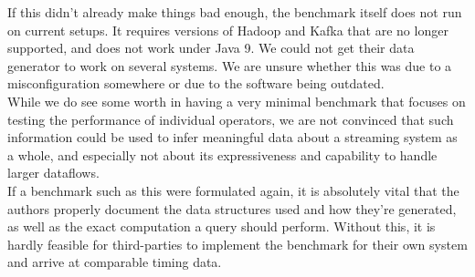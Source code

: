 If this didn't already make things bad enough, the benchmark itself does not run on current setups. It requires versions of Hadoop and Kafka that are no longer supported, and does not work under Java 9. We could not get their data generator to work on several systems. We are unsure whether this was due to a misconfiguration somewhere or due to the software being outdated. \\

While we do see some worth in having a very minimal benchmark that focuses on testing the performance of individual operators, we are not convinced that such information could be used to infer meaningful data about a streaming system as a whole, and especially not about its expressiveness and capability to handle larger dataflows. \\

If a benchmark such as this were formulated again, it is absolutely vital that the authors properly document the data structures used and how they're generated, as well as the exact computation a query should perform. Without this, it is hardly feasible for third-parties to implement the benchmark for their own system and arrive at comparable timing data.

